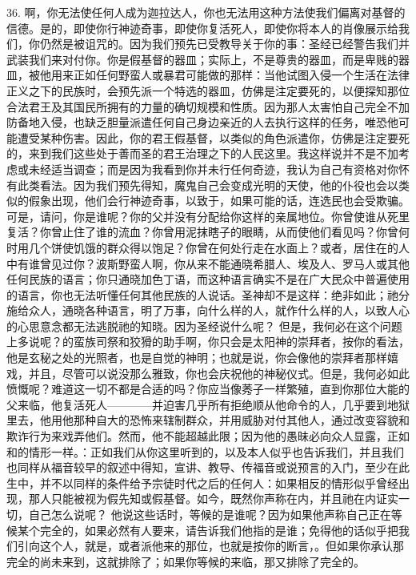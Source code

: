 36. 啊，你无法使任何人成为迦拉达人，你也无法用这种方法使我们偏离对基督的信德。是的，即使你行神迹奇事，即使你复活死人，即使你将本人的肖像展示给我们，你仍然是被诅咒的。因为我们预先已受教导关于你的事：圣经已经警告我们并武装我们来对付你。你是假基督的器皿；实际上，不是尊贵的器皿，而是卑贱的器皿，被他用来正如任何野蛮人或暴君可能做的那样：当他试图入侵一个生活在法律正义之下的民族时，会预先派一个特选的器皿，仿佛是注定要死的，以便探知那位合法君王及其国民所拥有的力量的确切规模和性质。因为那人太害怕自己完全不加防备地入侵，也缺乏胆量派遣任何自己身边亲近的人去执行这样的任务，唯恐他可能遭受某种伤害。因此，你的君王假基督，以类似的角色派遣你，仿佛是注定要死的，来到我们这些处于善而圣的君王治理之下的人民这里。我这样说并不是不加考虑或未经适当调查；而是因为我看到你并未行任何奇迹，我认为自己有资格对你怀有此类看法。因为我们预先得知，魔鬼自己会变成光明的天使，他的仆役也会以类似的假象出现，他们会行神迹奇事，以致于，如果可能的话，连选民也会受欺骗。可是，请问，你是谁呢？你的父并没有分配给你这样的亲属地位。你曾使谁从死里复活？你曾止住了谁的流血？你曾用泥抹瞎子的眼睛，从而使他们看见吗？你曾何时用几个饼使饥饿的群众得以饱足？你曾在何处行走在水面上？或者，居住在的人中有谁曾见过你？波斯野蛮人啊，你从来不能通晓希腊人、埃及人、罗马人或其他任何民族的语言；你只通晓加色丁语，而这种语言确实不是在广大民众中普遍使用的语言，你也无法听懂任何其他民族的人说话。圣神却不是这样：绝非如此；祂分施给众人，通晓各种语言，明了万事，向什么样的人，就作什么样的人，以致人心的心思意念都无法逃脱祂的知晓。因为圣经说什么呢？ 但是，我何必在这个问题上多说呢？的蛮族司祭和狡猾的助手啊，你只会是太阳神的崇拜者，按你的看法，他是玄秘之处的光照者，也是自觉的神明；也就是说，你会像他的崇拜者那样嬉戏，并且，尽管可以说没那么雅致，你也会庆祝他的神秘仪式。但是，我何必如此愤慨呢？难道这一切不都是合适的吗？你应当像莠子一样繁殖，直到你那位大能的父来临，他复活死人————并迫害几乎所有拒绝顺从他命令的人，几乎要到地狱里去，他用他那种自大的恐怖来辖制群众，并用威胁对付其他人，通过改变容貌和欺诈行为来戏弄他们。然而，他不能超越此限；因为他的愚昧必向众人显露，正如和的情形一样。：正如我们从你这里听到的，以及本人似乎也告诉我们，并且我们也同样从福音较早的叙述中得知，宣讲、教导、传福音或说预言的入门，至少在此生中，并不以同样的条件给予宗徒时代之后的任何人：如果相反的情形似乎曾经出现，那人只能被视为假先知或假基督。如今，既然你声称在内，并且祂在内证实一切，自己怎么说呢？ 他说这些话时，等候的是谁呢？因为如果他声称自己正在等候某个完全的，如果必然有人要来，请告诉我们他指的是谁；免得他的话似乎把我们引向这个人，就是，或者派他来的那位，也就是按你的断言，。但如果你承认那完全的尚未来到，这就排除了；如果你等候的来临，那又排除了完全的。\par

